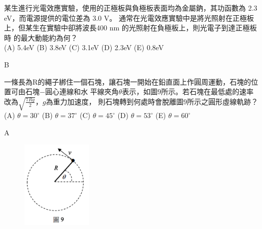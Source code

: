 \documentclass[cn,10pt,math=newtx,chinesefont=founder]{elegantbook}
\begin{document}
\begin{example}
    某生進行光電效應實驗，使用的正極板與負極板表面均為金屬鈉，其功函數為 2.3 eV，而電源提供的電位差為 3.0 V。
    通常在光電效應實驗中是將光照射在正極板上，但某生在實驗中卻將波長400 nm 的光照射在負極板上，則光電子到達正極板時
    的最大動能約為何？\\
    (A) 5.4eV (B) 3.8eV (C) 3.1eV (D) 2.3eV (E) 0.8eV \\
    \rightline{[109補考]}
\end{example}
\begin{solution}
    B
\end{solution}
\newpage

\begin{example}
    一條長為R的繩子綁住一個石塊，讓石塊一開始在鉛直面上作圓周運動，石塊的位置可由石塊−圓心連線和水
    平線夾角$\theta$表示，如圖9所示。若石塊在最低處的速率改為$\sqrt{\frac{7Rg}{2}}$，$g$為重力加速度，
    則石塊轉到何處時會脫離圖9所示之圓形虛線軌跡？\\
    (A) $\theta = 30^\circ$ (B) $\theta = 37^\circ$ (C) $\theta = 45^\circ$ (D) $\theta = 53^\circ$ (E) $\theta = 60^\circ$ \\
    \rightline{[109補考]}
\end{example}
\begin{solution}
    A
\end{solution}
\begin{figure}[htbp]
    \flushright
    \includegraphics[width=0.3\textwidth]{109_19.png}
\end{figure}
\newpage
\end{document}

